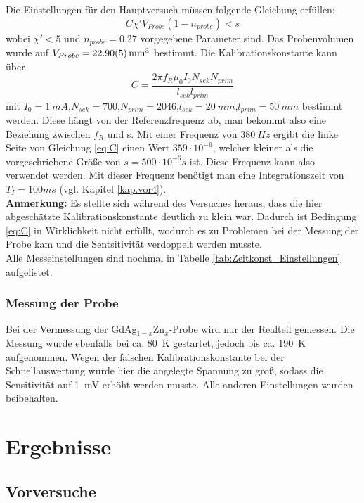 \documentclass[12pt,a4paper]{article}
\begin{document}
Die Einstellungen für den Hauptversuch müssen folgende Gleichung erfüllen:
\begin{equation}
C \chi' V_{Probe} (1-n_{probe})< s
\label{eq:C}
\end{equation}
wobei $\chi' < 5$ und $n_{probe} = 0.27$ vorgegebene Parameter sind. Das Probenvolumen wurde auf $V_{Probe} = \SI{22,90 \pm 0,05}{mm^3}$ bestimmt. Die Kalibrationskonstante kann über
\begin{equation}
C = \dfrac{2\pi f_R \mu_0 I_0 N_{sek} N_{prim}}{l_{sek} l_{prim}}
\end{equation}
mit $I_0 = \SI{1}{mA}$,$N_{sek} = 700$,$N_{prim} = 2046$,$l_{sek} = \SI{20}{mm}$,$l_{prim} = \SI{50}{mm}$ bestimmt werden. Diese hängt von der Referenzfrequenz ab, man bekommt also eine Beziehung zwischen $f_R$ und s. Mit einer Frequenz von $\SI{380}{Hz}$ ergibt die linke Seite von Gleichung \ref{eq:C} einen Wert $359\cdot 10^{-6}$, welcher kleiner als die vorgeschriebene Größe von $s = 500\cdot 10^{-6} s$ ist. Diese Frequenz kann also verwendet werden. Mit dieser Frequenz benötigt man eine Integrationszeit von $T_I = 100ms$ (vgl. Kapitel \ref{kap.vor4}).\\
\textbf{Anmerkung:} Es stellte sich während des Versuches heraus, dass die hier abgeschätzte Kalibrationskonstante deutlich zu klein war. Dadurch ist Bedingung \ref{eq:C} in Wirklichkeit nicht erfüllt, wodurch es zu Problemen bei der Messung der Probe kam und die Sentsitivität verdoppelt werden musste.\\
Alle Messeinstellungen sind nochmal in Tabelle \ref{tab:Zeitkonst_Einstellungen} aufgelistet.

\subsubsection{Messung der Probe}
Bei der Vermessung der GdAg$_{1-x}$Zn$_x$-Probe wird nur der Realteil gemessen. Die Messung wurde ebenfalls bei ca. \SI{80}{K} gestartet, jedoch bis ca. \SI{190}{K} aufgenommen. Wegen der falschen Kalibrationskonstante bei der Schnellauswertung wurde hier die angelegte Spannung zu groß, sodass die Sensitivität auf \SI{1}{mV} erhöht werden musste. Alle anderen Einstellungen wurden beibehalten.

\section{Ergebnisse}
\subsection{Vorversuche}
\end{document}
